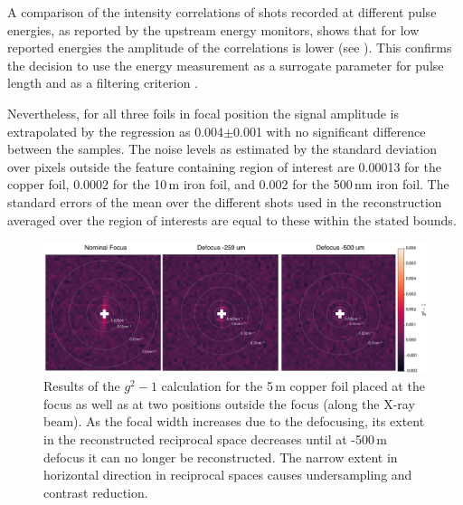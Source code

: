 A comparison of the intensity correlations of shots recorded at different pulse energies, as reported by the upstream energy monitors, shows that for low reported energies the amplitude of the correlations is lower (see ). This confirms the decision to use the energy measurement as a surrogate parameter for pulse length and as a filtering criterion \cite{inoue2019}.

Nevertheless, for all three foils in focal position the signal amplitude is extrapolated by the regression as 0.004$\pm$0.001 with no significant difference between the samples. The noise levels as estimated by the standard deviation over pixels outside the feature containing region of interest are  0.00013 for the copper foil, 0.0002 for the 10\,\textmu m iron  foil, and 0.002 for the 500\,nm  iron  foil. The standard errors of the mean over the different shots used in the reconstruction averaged over the region of interests are equal to these within the stated bounds.
\vspace*{1cm}
\begin{figure}
	\centering
	\includegraphics[width=0.99\linewidth]{images/Cu5um_reco2d.pdf}
	\caption[Results copper foil]{Results of the $g^2-1$ calculation for the 5\,\textmu m copper foil placed at the focus as well as at two positions outside the focus (along the X-ray beam). As the focal width increases due to the defocusing, its extent in the reconstructed reciprocal space decreases until at -500\,\textmu m defocus it can no longer be reconstructed. The narrow extent in horizontal direction in reciprocal spaces causes undersampling and contrast reduction. }
	\label{fig:Cu5umreco2d}
\end{figure}
